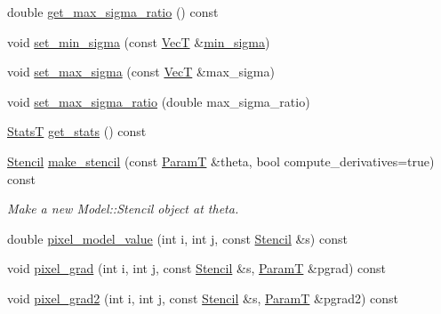\begin{DoxyCompactItemize}
\item 
double \hyperlink{classmappel_1_1Gauss2DsModel_a46da2752c2d1ca376b72d910818e47ae}{get\+\_\+max\+\_\+sigma\+\_\+ratio} () const 
\item 
void \hyperlink{classmappel_1_1Gauss2DsModel_a63d3481174444ff7f7b603a47aa8dcc1}{set\+\_\+min\+\_\+sigma} (const \hyperlink{namespacemappel_a2225ad69f358daa3f4f99282a35b9a3a}{VecT} \&\hyperlink{classmappel_1_1Gauss2DsModel_a8a97d37d210c1d161e4bc32c3a7b20dc}{min\+\_\+sigma})
\item 
void \hyperlink{classmappel_1_1Gauss2DsModel_a8ef1bc0d4dc27247d88ff2c7300a149d}{set\+\_\+max\+\_\+sigma} (const \hyperlink{namespacemappel_a2225ad69f358daa3f4f99282a35b9a3a}{VecT} \&max\+\_\+sigma)
\item 
void \hyperlink{classmappel_1_1Gauss2DsModel_a85925eaef6d69c5f6b3ceeae3364dd68}{set\+\_\+max\+\_\+sigma\+\_\+ratio} (double max\+\_\+sigma\+\_\+ratio)
\item 
\hyperlink{namespacemappel_a04ab395b0cf82c4ce68a36b2212649a5}{StatsT} \hyperlink{classmappel_1_1Gauss2DsModel_a9c59a143645ffdacd13b1dc332828cfb}{get\+\_\+stats} () const 
\item 
\hyperlink{classmappel_1_1Gauss2DsModel_1_1Stencil}{Stencil} \hyperlink{classmappel_1_1Gauss2DsModel_a797aeb7c17a24a7df89597789a0eacb4}{make\+\_\+stencil} (const \hyperlink{classmappel_1_1PointEmitterModel_a665ec6aea3aac139bb69a23c06d4b9a1}{ParamT} \&theta, bool compute\+\_\+derivatives=true) const 
\begin{DoxyCompactList}\small\item\em Make a new Model\+::\+Stencil object at theta. \end{DoxyCompactList}\item 
double \hyperlink{classmappel_1_1Gauss2DsModel_adab5850638261d71b88e1879fd22ff00}{pixel\+\_\+model\+\_\+value} (int i, int j, const \hyperlink{classmappel_1_1Gauss2DsModel_1_1Stencil}{Stencil} \&s) const 
\item 
void \hyperlink{classmappel_1_1Gauss2DsModel_a8c46a4ca74f2aa48e6607fb998a2e22d}{pixel\+\_\+grad} (int i, int j, const \hyperlink{classmappel_1_1Gauss2DsModel_1_1Stencil}{Stencil} \&s, \hyperlink{classmappel_1_1PointEmitterModel_a665ec6aea3aac139bb69a23c06d4b9a1}{ParamT} \&pgrad) const 
\item 
void \hyperlink{classmappel_1_1Gauss2DsModel_a3775c60f914e1873ecfcd67c64fbc1e8}{pixel\+\_\+grad2} (int i, int j, const \hyperlink{classmappel_1_1Gauss2DsModel_1_1Stencil}{Stencil} \&s, \hyperlink{classmappel_1_1PointEmitterModel_a665ec6aea3aac139bb69a23c06d4b9a1}{ParamT} \&pgrad2) const 

\end{DoxyCompactItemize}
